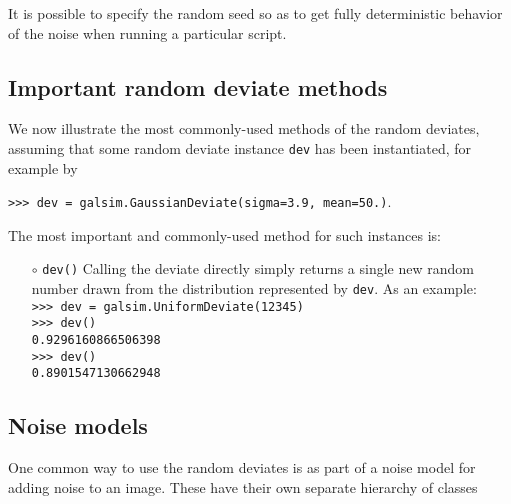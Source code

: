 \documentclass[preprint,10pt]{../../devel/modules/aastex}
\begin{document}
It is possible to specify the random seed so as to get fully
deterministic behavior of the noise when running a particular script.

\subsection{Important random deviate methods}\label{sect:randommethods}
We now illustrate the most commonly-used methods of the random
deviates, assuming that some random deviate instance \texttt{dev} has
been instantiated, for example by

\texttt{>>> dev = galsim.GaussianDeviate(sigma=3.9, mean=50.)}.

The most important and commonly-used method for such
instances is:
\begin{itemize}

  \item[$\circ$] \texttt{dev()}
    \newline
    Calling the deviate directly simply returns a single new random number drawn from the
    distribution
    represented by \texttt{dev}.  As an example:\newline \\
    \texttt{>>> dev = galsim.UniformDeviate(12345)}\\
    \texttt{>>> dev()} \\
    \texttt{0.9296160866506398} \\
    \texttt{>>> dev() }\\
    \texttt{0.8901547130662948}

\end{itemize}

\subsection{Noise models}\label{sect:noisemodels}

One common way to use the random deviates is as part of a noise model for adding
noise to an image.  These have their own separate hierarchy of classes
\end{document}
